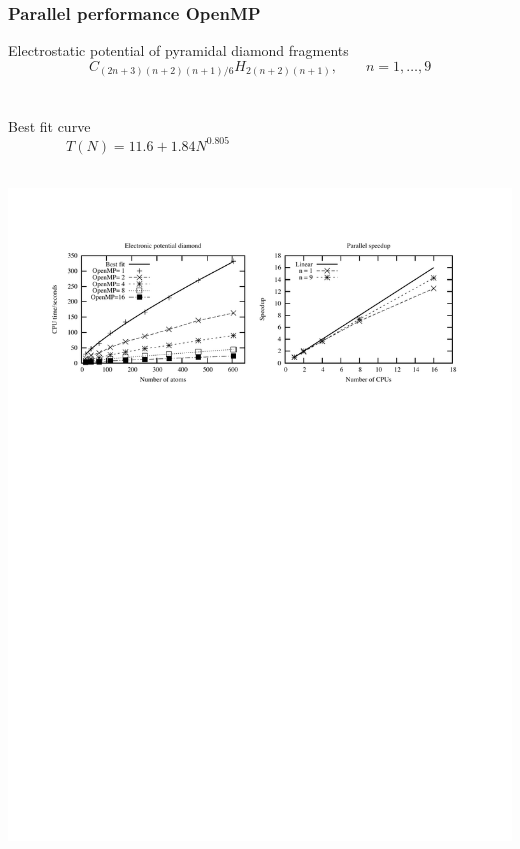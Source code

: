 \documentclass[mathserif]{beamer}
\begin{document}
\begin{frame}
    \frametitle{Parallel performance OpenMP}
    Electrostatic potential of pyramidal diamond fragments \\
    \begin{equation}
	\nonumber
	C_{(2n+3)(n+2)(n+1)/6}H_{2(n+2)(n+1)}, \qquad n=1,\dots,9
    \end{equation}
    \ \\
    \ \\
    Best fit curve
    \begin{equation}
	\nonumber
	T(N) = 11.6 + 1.84N^{0.805} \qquad\qquad\qquad\qquad\qquad\qquad\qquad\qquad
    \end{equation}
    \ \\
    \begin{center}
	\includegraphics[scale=0.6, clip, viewport = 50 550 540 730]{figures/ompScaling.pdf}
    \end{center}
\end{frame}
\end{document}
